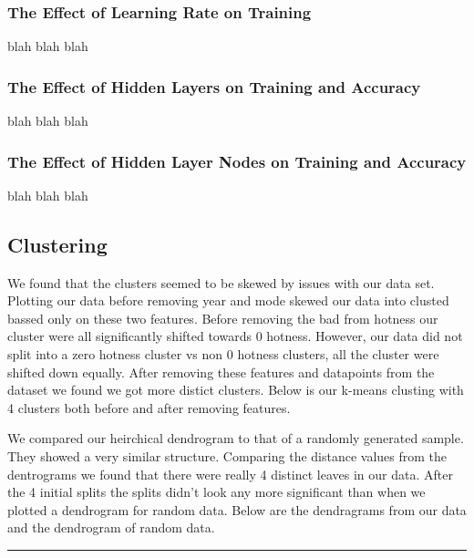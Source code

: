 \documentclass[12pt]{article}
\newcommand{\horizontalLine}{
	\begin{center}
		\hrule width 1.0\textwidth
	\end{center}
}
\begin{document}
\subsubsection{The Effect of Learning Rate on Training}
\label{subsubsec:annLearningRateResults}
blah blah blah

\subsubsection{The Effect of Hidden Layers on Training and Accuracy}
\label{subsubsec:annHiddenLayerResults}
blah blah blah

\subsubsection{The Effect of Hidden Layer Nodes on Training and Accuracy}
\label{subsubsec:annHiddenLayerNodesResults}
blah blah blah
\subsection{Clustering}
\label{subsec:clusteringResults}

We found that the clusters seemed to be skewed by issues with our data set. Plotting our data before removing year and mode skewed our data into clusted bassed only on these two features. Before removing the bad from hotness our cluster were all significantly shifted towards 0 hotness. However, our data did not split into a zero hotness cluster vs non 0 hotness clusters, all the cluster were shifted down equally. After removing these features and datapoints from the dataset we found we got more distict clusters. Below is our k-means clusting with 4 clusters both before and after removing features.


We compared our heirchical dendrogram to that of a randomly generated sample. They showed a very similar structure. Comparing the distance values from the dentrograms we found that there were really 4 distinct leaves in our data. After the 4 initial splits the splits didn't look any more significant than when we plotted a dendrogram for random data. Below are the dendragrams from our data and the dendrogram of random data.


  


\horizontalLine
\end{document}

